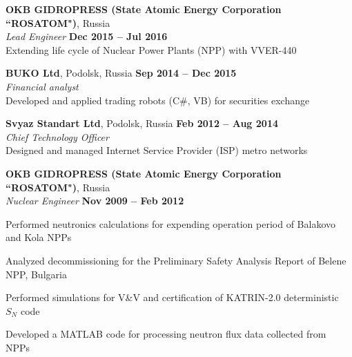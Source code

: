 \documentclass[margin,line]{resume}
\begin{document}
\begin{resume}
    \textbf{OKB GIDROPRESS (State Atomic Energy Corporation ``ROSATOM")}, 
    Russia \\
		\textsl{Lead Engineer} \hfill \textbf{Dec 2015 -- Jul 2016}\\
                Extending life cycle of Nuclear Power Plants (NPP) with 
                VVER-440

    \textbf{BUKO Ltd}, Podolsk, Russia \hfill \textbf{Sep 2014 -- Dec 2015}\\
		\textsl{Financial analyst}\\
		Developed and applied trading robots (C\#, VB) for securities exchange

    \textbf{Svyaz Standart Ltd}, Podolsk, Russia \hfill \textbf{Feb 2012 -- Aug 2014}\\
		\textsl{Chief Technology Officer}\\
		Designed and managed Internet Service Provider (ISP) metro networks

    \textbf{OKB GIDROPRESS (State Atomic Energy Corporation ``ROSATOM")}, 
    Russia \\
		\textsl{Nuclear Engineer} \hfill \textbf{Nov 2009 -- Feb 2012}\\
                \vspace{-4mm}\begin{list2}
				\item Performed neutronics calculations for expending 
				operation period of Balakovo and Kola NPPs
				\item Analyzed decommissioning for the Preliminary Safety 
				Analysis Report of Belene NPP, Bulgaria
				\item Performed simulations for V\&V and certification of  
				KATRIN-2.0 deterministic $S_N$ code
				\item Developed a MATLAB code for processing neutron flux data 
				collected from NPPs
                \end{list2}


\end{resume}
\end{document}
